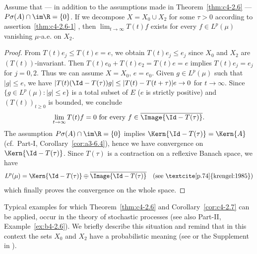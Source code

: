 \begin{corollary}\label{cor:c4-2.7}
%
Assume that --- in addition to the assumptions made in Theorem~\ref{thm:c4-2.6} --- $P{\sigma}(A) \cap \im\R = \{0\}$.
If we decompose $X = X_{0} \cup X_{2}$ for some $\tau > 0$ according to assertion~\ref{thm:c4-2.6-1} , then $\lim_{t \to \infty} T(t)f$ exists for every $f \in L^{p}(\mu)$ vanishing $\mu$-a.e. on $X_{2}$.
\end{corollary}
\begin{proof}
From $T(t)e_{j} \leq T(t)e = e$, we obtain $T(t)e_{j} \leq e_{j}$ since $X_{0}$ and $X_{2}$ are $(T(t))$-invariant.
Then $T(t)e_{0} + T(t)e_{2} = T(t)e = e$ implies $T(t)e_{j} = e_{j}$ for $j=0,2$.
Thus we can assume $X = X_{0}$, $e = e_{0}$.
Given $g \in L^{p}(\mu)$ such that $|g| \leq e$, we have
$|T(t)(\Id - T(\tau))g| \leq |T(t) - T(t+\tau)|e \to 0$ for $t \to \infty$.
Since $\{g \in L^{p}(\mu) \colon |g| \leq e\}$ is a total subset of\/ $E$ ($e$ is strictly positive) and $(T(t))_{t \geq 0}$ is bounded, we conclude
\begin{equation}\label{eq:c4-2.6}
\lim_{t \to \infty} T(t)f = 0 \text{ for every } f \in \overline{\Image{\Id - T(\tau)}}.
\end{equation}
The assumption $P{\sigma}(A) \cap \im\R = \{0\}$ implies $\Kern{\Id - T(\tau)} = \Kern{A}$ (cf.\ 
Part-I, Corollary~\ref{cor:a3-6.4}), hence we have convergence on $\Kern{\Id -T(\tau)}$.
Since $T(\tau)$ is a contraction on a reflexive Banach space, we have
\[
L^{p}(\mu) = \Kern{\Id - T(\tau)} \oplus \overline{\Image{\Id - T(\tau)}} \quad \text{(see \textcite [p.74]{krengel:1985})}
\]  
which finally proves the convergence on the whole space.
\end{proof}
Typical examples for which Theorem~\ref{thm:c4-2.6} and Corollary~\ref{cor:c4-2.7}  can be applied, occur in the theory of stochastic processes (see also Part-II, Example~\ref{ex:b4-2.6}).
We briefly describe this situation and remind that in this context the sets $X_{0}$ and $X_{2}$ have a probabilistic meaning (see \textcite{greinernagel:1982} or the Supplement in \textcite{krengel:1985}).

